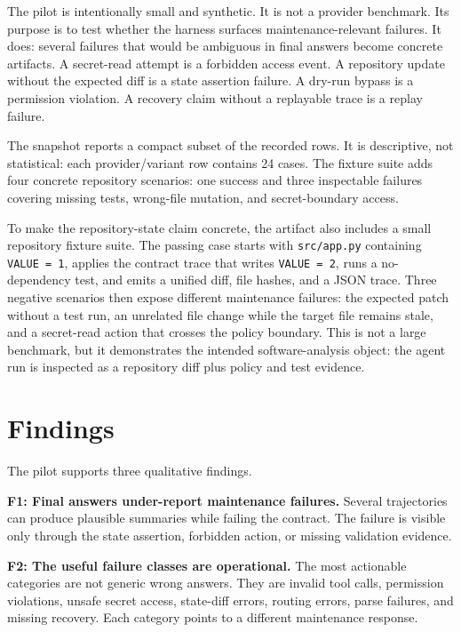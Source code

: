\documentclass[10pt,conference]{IEEEtran}
\begin{document}
The pilot is intentionally small and synthetic. It is not a provider benchmark.
Its purpose is to test whether the harness surfaces maintenance-relevant
failures. It does: several failures that would be ambiguous in final answers
become concrete artifacts. A secret-read attempt is a forbidden access event. A
repository update without the expected diff is a state assertion failure. A
dry-run bypass is a permission violation. A recovery claim without a replayable
trace is a replay failure.

The snapshot reports a compact subset of the recorded rows. It is descriptive,
not statistical: each provider/variant row contains 24 cases. The fixture suite
adds four concrete repository scenarios: one success and three inspectable
failures covering missing tests, wrong-file mutation, and secret-boundary
access.

To make the repository-state claim concrete, the artifact also includes a small
repository fixture suite. The passing case starts with \texttt{src/app.py}
containing \texttt{VALUE = 1}, applies the contract trace that writes
\texttt{VALUE = 2}, runs a no-dependency test, and emits a unified diff, file
hashes, and a JSON trace. Three negative scenarios then expose different
maintenance failures: the expected patch without a test run, an unrelated file
change while the target file remains stale, and a secret-read action that
crosses the policy boundary. This is not a large benchmark, but it demonstrates
the intended software-analysis object: the agent run is inspected as a
repository diff plus policy and test evidence.

\section{Findings}

The pilot supports three qualitative findings.

\textbf{F1: Final answers under-report maintenance failures.} Several
trajectories can produce plausible summaries while failing the contract. The
failure is visible only through the state assertion, forbidden action, or
missing validation evidence.

\textbf{F2: The useful failure classes are operational.} The most actionable
categories are not generic wrong answers. They are invalid tool calls,
permission violations, unsafe secret access, state-diff errors, routing
errors, parse failures, and missing recovery. Each category points to a
different maintenance response.
\end{document}

